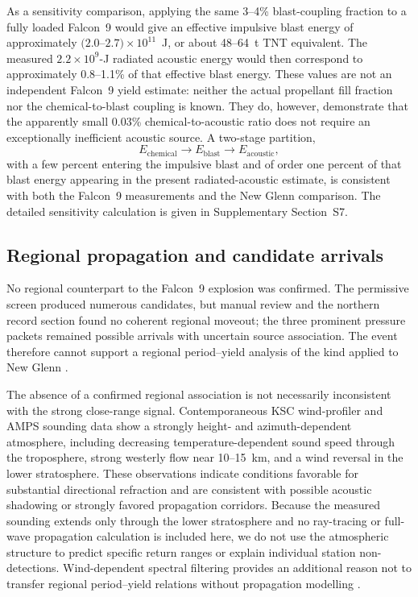 \documentclass[]{seismica}
\begin{document}
As a sensitivity comparison, applying the same 3--4\% blast-coupling fraction
to a fully loaded Falcon~9 would give an effective impulsive blast energy of
approximately $(2.0$--$2.7)\times10^{11}$~J, or about 48--64~t TNT
equivalent. The measured $2.2\times10^9$-J radiated acoustic energy would then
correspond to approximately 0.8--1.1\% of that effective blast energy. These
values are not an independent Falcon~9 yield estimate: neither the actual
propellant fill fraction nor the chemical-to-blast coupling is known. They do,
however, demonstrate that the apparently small 0.03\% chemical-to-acoustic
ratio does not require an exceptionally inefficient acoustic source. A
two-stage partition,
\[
 E_{\mathrm{chemical}}
 \rightarrow E_{\mathrm{blast}}
 \rightarrow E_{\mathrm{acoustic}},
\]
with a few percent entering the impulsive blast and of order one percent of
that blast energy appearing in the present radiated-acoustic estimate, is
consistent with both the Falcon~9 measurements and the New Glenn comparison.
The detailed sensitivity calculation is given in Supplementary Section~S7.

\subsection{Regional propagation and candidate arrivals}

No regional counterpart to the Falcon~9 explosion was confirmed. The
permissive screen produced numerous candidates, but manual review and the
northern record section found no coherent regional moveout; the three
prominent pressure packets remained possible arrivals with uncertain source association. The event therefore
cannot support a regional period--yield analysis of the kind applied to New
Glenn \citep{silber_scamfer_newglenn_2026}.

The absence of a confirmed regional association is not necessarily inconsistent with the strong
close-range signal. Contemporaneous KSC wind-profiler and AMPS sounding data
show a strongly height- and azimuth-dependent atmosphere, including decreasing
temperature-dependent sound speed through the troposphere, strong westerly
flow near 10--15~km, and a wind reversal in the lower stratosphere. These
observations indicate conditions favorable for substantial directional
refraction and are consistent with possible acoustic shadowing or strongly
favored propagation corridors. Because the measured sounding extends only
through the lower stratosphere and no ray-tracing or full-wave propagation
calculation is included here, we do not use the atmospheric structure to
predict specific return ranges or explain individual station
non-detections. Wind-dependent spectral filtering provides an additional
reason not to transfer regional period--yield relations without propagation
modelling \citep{silber_wind_filtering_2026}.
\end{document}
